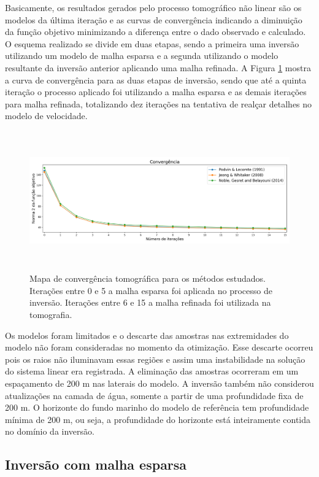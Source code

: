 Basicamente, os resultados gerados pelo processo tomográfico não linear são os modelos da última iteração e as curvas de convergência indicando a diminuição da função objetivo minimizando a diferença entre o dado observado e calculado. O esquema realizado se divide em duas etapas, sendo a primeira uma inversão utilizando um modelo de malha esparsa e a segunda utilizando o modelo resultante da inversão anterior aplicando uma malha refinada. A Figura \ref{fig:convergencia} mostra a curva de convergência para as duas etapas de inversão, sendo que até a quinta iteração o processo aplicado foi utilizando a malha esparsa e as demais iterações para malha refinada, totalizando dez iterações na tentativa de realçar detalhes no modelo de velocidade.   

\begin{figure}[H]
	\centering
	\includegraphics[width=16cm,height=6cm]{Imgs/Resultados/convergencia.png}
	\caption{Mapa de convergência tomográfica para os métodos estudados. Iterações entre 0 e 5 a malha esparsa foi aplicada no processo de inversão. Iterações entre 6 e 15 a malha refinada foi utilizada na tomografia.}
	\label{fig:convergencia}	
\end{figure}

Os modelos foram limitados e o descarte das amostras nas extremidades do modelo não foram consideradas no momento da otimização. Esse descarte ocorreu pois os raios não iluminavam essas regiões e assim uma instabilidade na solução do sistema linear era registrada. A eliminação das amostras ocorreram em um espaçamento de 200 m nas laterais do modelo. A inversão também não considerou atualizações na camada de água, somente a partir de uma profundidade fixa de 200 m. O horizonte do fundo marinho do modelo de referência tem profundidade mínima de 200 m, ou seja, a profundidade do horizonte está inteiramente contida no domínio da inversão.     

\subsection*{Inversão com malha esparsa}

